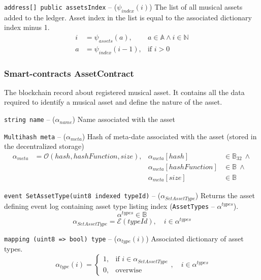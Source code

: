 \documentclass[12pt]{report}
\newcommand{\hlc}[1]{\colorbox{white!25}{#1}}
\def\code#1{\colorbox{light-gray}{\texttt{#1}}}
\begin{document}
\code{address[] public assetsIndex} – ($\psi_{index}(i)$)\hfill\null\linebreak
The list of all musical assets added to the ledger. Asset index in the list is equal to the associated dictionary index minus 1.
\begin{align}
i &= \psi_{assets}(a), &a \in \mathbb{A} \wedge i \in \mathbb{N} \\
a &= \psi_{index}(i - 1), &\text{if } i > 0
\end{align}

\subsubsection{Smart-contracts AssetContract}
\label{tech-apps-assets-contract}
The blockchain record about registered musical asset. It contains all the data required to identify a musical asset and define the nature of the asset.

\code{string name} – ($\alpha_{name}$)\hfill\null\linebreak
Name associated with the asset

\code{Multihash meta} – ($\alpha_{meta}$)\hfill\null\linebreak
Hash \hlc{of} meta-date associated with the asset (stored in the decentralized storage)
\begin{align}
\alpha_{meta} &= \mathcal{O}(hash, hashFunction, size), &\alpha_{meta}[hash] &\in \mathbb{B}_{32} \ \wedge \\ 
&&\alpha_{meta}[hashFunction] &\in \mathbb{B} \ \wedge \\
&& \alpha_{meta}[size] &\in \mathbb{B}
\end{align}

\code{event SetAssetType(uint8 indexed typeId)} – ($\alpha_{SetAssetType}$)\hfill\null\linebreak
Returns the asset defining event log containing asset type listing index (\code{AssetTypes} – $\alpha^{types}$).
\begin{equation}
\alpha^{types} \in \mathbb{B}
\end{equation}
\begin{equation}
\alpha_{SetAssetType} = \mathcal{E}(typeId), \quad i \in \alpha^{types}
\end{equation}

\code{mapping (uint8 => bool) type} – ($\alpha_{type}(i)$)\hfill\null\linebreak
Associated dictionary of asset types.
\begin{equation}
\alpha_{type}(i) = \begin{cases}
1, & \text{if } i \in \alpha_{SetAssetType} \\
0, & \text{overwise}
\end{cases}, \quad i \in \alpha^{types}
\end{equation}
\end{document}
